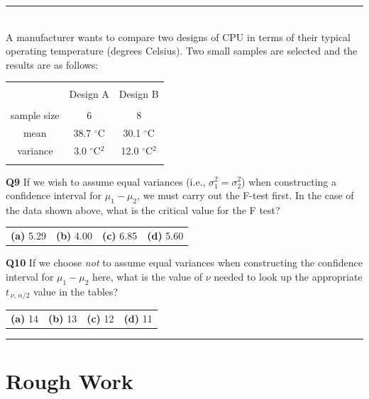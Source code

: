 \documentclass[12pt]{article}
\begin{document}
\rule{\linewidth}{1pt}
\quad\\
A manufacturer wants to compare two designs of CPU in terms of their typical operating temperature (degrees Celsius). Two small samples are selected and the results are as follows:
\begin{small}
\begin{center}
\begin{tabular}{|c|c|c|}
\hline
&&\\[-0.3cm]
& Design A & Design B \\
\hline
&&\\[-0.2cm]
sample size      & 6 & 8 \\[0.2cm]
mean   & 38.7 $^\circ$C & 30.1 $^\circ$C \\[0.2cm]
variance &  3.0 $^\circ$C$^2$ & 12.0 $^\circ$C$^2$ \\[0.2cm]
\hline
\multicolumn{3}{c}{}
\end{tabular}
\end{center}
\end{small}


{\bf Q9} If we wish to assume equal variances (i.e., $\sigma_1^2=\sigma_2^2$) when constructing a confidence interval for $\mu_1-\mu_2$, we must carry out the F-test first. In the case of the data shown above, what is the critical value for the F test? \\[0.2cm]
\begin{tabular}{cccc}
{\bf(a)} 5.29 & {\bf(b)} 4.00  & {\bf(c)} 6.85 & {\bf(d)} 5.60 \\[0.6cm]
\end{tabular}

{\bf Q10} If we choose \emph{not} to assume equal variances when constructing the confidence interval for $\mu_1-\mu_2$ here, what is the value of $\nu$ needed to look up the appropriate $t_{\,\nu,\,\alpha/2}$ value in the tables?\\[0.2cm]
\begin{tabular}{cccc}
{\bf(a)} 14 & {\bf(b)} 13  & {\bf(c)} 12 & {\bf(d)} 11 \\[0.6cm]
\end{tabular}


\rule{\linewidth}{1pt}

\newpage

\section*{Rough Work\\[23cm]}
\end{document}
